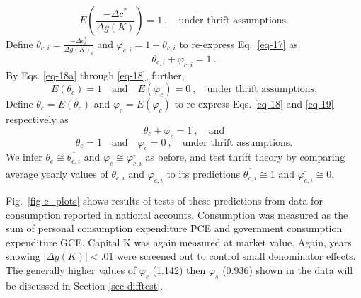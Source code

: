 \documentclass[a4paper,fleqn]{latex_styles/cas-sc}
\begin{document}
% 
\begin{equation}
    E(\frac{- \Delta c^{*}}{ \Delta g(K)}) = 1\ ,\quad \text{under thrift assumptions.}\label{eq-17}
\end{equation}
%
Define \(\theta_{c,i} = \frac{- \Delta c^{*}_{i}}{ \Delta g(K)_{i}}\)
and \(\varphi_{c,i} = 1 - \theta_{c,i}\) to
re-express Eq.~\eqref{eq-17} as
%
\begin{equation}
\theta_{c,i} + \varphi_{c,i} = 1\ .\label{eq-18}
\end{equation}
%
By Eqs. \eqref{eq-18a} through \eqref{eq-18}, further,
%
\begin{equation}
    E\left( \theta_{c} \right) = 1 \quad \text{and} \quad E\left( \varphi_{c} \right) = 0 \ , \quad \text{under thrift assumptions.}\label{eq-19}
\end{equation}
%
Define \(\theta_{c} = E\left( \theta_{c} \right)\) and
\(\varphi_{c} = E\left( \varphi_{c} \right)\) to re-express
Eqs. \eqref{eq-18} and \eqref{eq-19} respectively as
\begin{equation}
    \theta_c + \varphi_c = 1 \ , \quad \text{and}
    \label{eq-20}
\end{equation}
\vspace{-5ex}
\begin{equation}
    \theta_c = 1 \quad \text{and} \quad \varphi_c = 0 \ , \quad \text{under thrift assumptions.}
    \label{eq-21}
\end{equation}
We infer \(\theta_c \cong \overline{\theta_{c,i}}\) and \(\varphi_c \cong \overline{\varphi_{c,i}}\) as before, and test thrift theory by comparing average yearly values of $\theta_{c,i}$ and $\varphi_{c,i}$ to its predictions $\overline{\theta_{c,i}} \cong 1$ and $\overline{\varphi_{c,i}} \cong 0$.

Fig.~\ref{fig-c_plots} shows results of tests of these predictions from
data for consumption reported in national accounts. Consumption was
measured as the sum of personal consumption expenditure PCE and
government consumption expenditure GCE. Capital K was again measured at
market value. Again, years showing \(|\Delta g(K)| < .01\) were screened
out to control small denominator effects. 
The generally higher values of \(\varphi_c\) (1.142) then \(\varphi_s\) (0.936) shown in the data will be discussed in Section \ref{sec-difftest}.  

\FloatBarrier

\FloatBarrier
\end{document}
